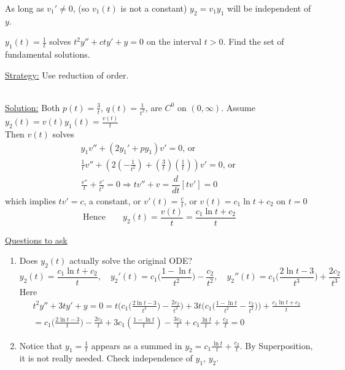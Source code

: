As long as $v_1' \neq 0$, (so $v_1(t)$ is not a constant) $y_2 = v_1y_1$ will be independent of $y$.
\begin{example-N}
	$y_1(t) = \frac{1}{t}$ solves $t^2y'' + cty' + y = 0$ on the interval $t > 0$. Find the set of fundamental solutions.\\
	\redhline
	\begin{center}
		\underline{Strategy:} Use reduction of order.
	\end{center}
	\redhline\\
	\underline{Solution:} Both $p(t) = \frac{3}{t}$, $q(t) = \frac{1}{t^2}$, are $C^0$ on $(0, \infty)$. Assume $y_2(t) = v(t)y_1(t) = \frac{v(t)}{t}$\\
	Then $v(t)$ solves
	\begin{align*}
		y_1v'' + (2y_1' + py_1)v' = 0 \text{, or }\\
		\frac{1}{t}v'' + (2(-\frac{1}{t^2}) + (\frac{3}{t})(\frac{1}{t}))v' = 0\text{, or }\\
		\frac{v''}{t} + \frac{v'}{t^2} = 0 \Rightarrow tv'' + v = \dfrac{d}{dt}[tv'] = 0 
	\end{align*}
	which implies $tv' = c$, a constant, or $v'(t) = \frac{c}{t}$, or $v(t) = c_1\ln t + c_2$ on $t=0$
	\begin{equation*}
		\text{Hence} \quad \quad y_2(t) = \frac{v(t)}{t} = \frac{c_1 \ln t + c_2}{t}
	\end{equation*}
\end{example-N} 
{\large \underline{Questions to ask}}
\begin{enumerate}[label=\protect\circled{\Roman*}]
	\item Does $y_2(t)$ actually solve the original ODE?
	\begin{equation*}
		y_2(t) = \frac{c_1 \ln t + c_2}{t}, \quad y_2'(t) = c_1 \bigg( \frac{1 - \ln t}{t^2} \bigg) - \frac{c_2}{t^2}, \quad y_2''(t) = c_1 \bigg(\frac{2 \ln t - 3}{t^3} \bigg) + \frac{2c_2}{t^3}
	\end{equation*}
	Here
	\begin{align*}
		t^2y'' + 3ty' + y = 0 = t\bigg(c_1\bigg(\frac{2 \ln t - 3}{t^3}\bigg) - \frac{2c_2}{t^3}\bigg) + 3t\bigg(c_1  \big(\frac{1 - \ln t}{t^2} - \frac{c_2}{t^2}\big)\bigg) + \frac{c_1 \ln t + c_2}{t}\\
		= c_1\bigg(\frac{2 \ln t - 3}{t} \bigg) - \frac{2c_2}{t} + 3c_1(\frac{1 - \ln t}{t}) - \frac{3c_2}{t} + c_1 \frac{\ln t}{t} + \frac{c_2}{t} = 0 
	\end{align*}
	\item Notice that $y_1 = \frac{1}{t}$ appears as a summed in $y_2 = c_1 \frac{\ln t}{t} + \frac{c_2}{t}$. By Superposition, it is not really needed. Check independence of $y_1$, $y_2$.
\end{enumerate}
